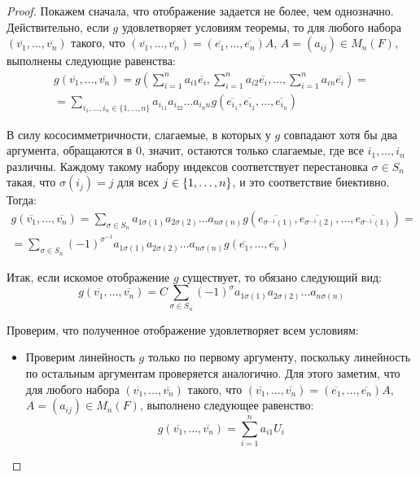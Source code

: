 \begin{proof}
	Покажем сначала, что отображение задается не более, чем однозначно. Действительно, если $g$ удовлетворяет условиям теоремы, то для любого набора $(\overline{v_1}, \dots, \overline{v_n})$ такого, что $(\overline{v_1}, \dots, \overline{v_n}) = (\overline{e_1}, \dots, \overline{e_n})A$, $A = (a_{ij}) \in M_n(F)$, выполнены следующие равенства:
	\begin{multline*}
		g(\overline{v_1}, \dots, \overline{v_n}) = g\left(\sum_{i = 1}^{n}a_{i1}\overline{e_i}, \sum_{i = 1}^{n}a_{i2}\overline{e_i}, \dots, \sum_{i = 1}^{n}a_{in}\overline{e_i}\right) = \\
		= \sum_{i_1, \dots, i_n \in \{1, \dots, n\}}a_{i_11}a_{i_22}\dots a_{i_nn}g(\overline{e_{i_1}}, \overline{e_{i_2}}, \dots, \overline{e_{i_n}})
	\end{multline*}
	
	В силу кососимметричности, слагаемые, в которых у $g$ совпадают хотя бы два аргумента, обращаются в $0$, значит, остаются только слагаемые, где все $i_1, \dots, i_n$ различны. Каждому такому набору индексов соответствует перестановка $\sigma \in S_n$ такая, что $\sigma(i_j) = j$ для всех $j \in \{1, \dotsc, n\}$, и это соответствие биективно. Тогда:
	\begin{multline*}
		g(\overline{v_1}, \dots, \overline{v_n}) = \sum_{\sigma \in S_n}a_{1 \sigma(1)}a_{2 \sigma(2)}\dots a_{n \sigma(n)}g(\overline{e_{\sigma^{-1}(1)}}, \overline{e_{\sigma^{-1}(2)}}, \dots, \overline{e_{\sigma^{-1}(1)}}) = \\
		= \sum_{\sigma \in S_n}(-1)^{\sigma^{-1}}a_{1 \sigma(1)}a_{2 \sigma(2)}\dots a_{n \sigma(n)}g(\overline{e_1}, \dots, \overline{e_n})
	\end{multline*}
	
	Итак, если искомое отображение $g$ существует, то обязано следующий вид:
	\[g(\overline{v_1}, \dots, \overline{v_n}) = C\sum_{\sigma \in S_n}(-1)^\sigma a_{1 \sigma(1)}a_{2 \sigma(2)}\dots a_{n \sigma(n)}\]
		
	Проверим, что полученное отображение удовлетворяет всем условиям:
	\begin{itemize}
		\item Проверим линейность $g$ только по первому аргументу, поскольку линейность по оста\-льным аргументам проверяется аналогично. Для этого заметим, что для любого набора $(\overline{v_1}, \dots, \overline{v_n})$ такого, что $(\overline{v_1}, \dots, \overline{v_n}) = (\overline{e_1}, \dots, \overline{e_n})A$, $A = (a_{ij}) \in M_n(F)$, выполнено следующее равенство: \[g(\overline{v_1}, \dots, \overline{v_n}) = \sum_{i = 1}^na_{i1}U_i\]
		

\end{itemize}
\end{proof}

